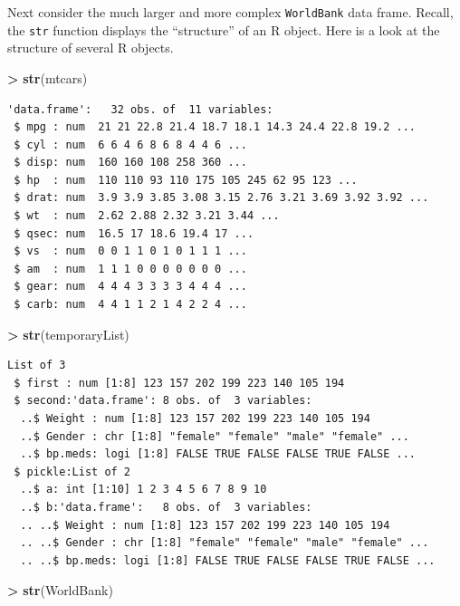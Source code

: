 \documentclass[
]{krantz}
\makeatletter
\newenvironment{Shaded}{\begin{snugshade}}{\end{snugshade}}
\newcommand{\KeywordTok}[1]{\textcolor[rgb]{0.27,0.27,0.27}{\textbf{#1}}}
\newcommand{\NormalTok}[1]{#1}
\newcommand{\OperatorTok}[1]{\textcolor[rgb]{0.43,0.43,0.43}{\textbf{#1}}}
\newcommand{\StringTok}[1]{\textcolor[rgb]{0.5,0.5,0.5}{#1}}
\newenvironment{kframe}{%
\medskip{}
\setlength{\fboxsep}{.8em}
 \def\at@end@of@kframe{}%
 \ifinner\ifhmode%
  \def\at@end@of@kframe{\end{minipage}}%
  \begin{minipage}{\columnwidth}%
 \fi\fi%
 \def\FrameCommand##1{\hskip\@totalleftmargin \hskip-\fboxsep
 \colorbox{shadecolor}{##1}\hskip-\fboxsep
     \hskip-\linewidth \hskip-\@totalleftmargin \hskip\columnwidth}%
 \MakeFramed {\advance\hsize-\width
   \@totalleftmargin\z@ \linewidth\hsize
   \@setminipage}}%
 {\par\unskip\endMakeFramed%
 \at@end@of@kframe}
\renewenvironment{Shaded}{\begin{kframe}}{\end{kframe}}
\makeatother
\begin{document}
Next consider the much larger and more complex \texttt{WorldBank} data frame. Recall, the \texttt{str} function displays the ``structure'' of an R object. Here is a look at the structure of several R objects.

\begin{Shaded}
\begin{Highlighting}[]
\OperatorTok{\textgreater{}}\StringTok{ }\KeywordTok{str}\NormalTok{(mtcars)}
\end{Highlighting}
\end{Shaded}

\begin{verbatim}
'data.frame':   32 obs. of  11 variables:
 $ mpg : num  21 21 22.8 21.4 18.7 18.1 14.3 24.4 22.8 19.2 ...
 $ cyl : num  6 6 4 6 8 6 8 4 4 6 ...
 $ disp: num  160 160 108 258 360 ...
 $ hp  : num  110 110 93 110 175 105 245 62 95 123 ...
 $ drat: num  3.9 3.9 3.85 3.08 3.15 2.76 3.21 3.69 3.92 3.92 ...
 $ wt  : num  2.62 2.88 2.32 3.21 3.44 ...
 $ qsec: num  16.5 17 18.6 19.4 17 ...
 $ vs  : num  0 0 1 1 0 1 0 1 1 1 ...
 $ am  : num  1 1 1 0 0 0 0 0 0 0 ...
 $ gear: num  4 4 4 3 3 3 3 4 4 4 ...
 $ carb: num  4 4 1 1 2 1 4 2 2 4 ...
\end{verbatim}

\begin{Shaded}
\begin{Highlighting}[]
\OperatorTok{\textgreater{}}\StringTok{ }\KeywordTok{str}\NormalTok{(temporaryList)}
\end{Highlighting}
\end{Shaded}

\begin{verbatim}
List of 3
 $ first : num [1:8] 123 157 202 199 223 140 105 194
 $ second:'data.frame': 8 obs. of  3 variables:
  ..$ Weight : num [1:8] 123 157 202 199 223 140 105 194
  ..$ Gender : chr [1:8] "female" "female" "male" "female" ...
  ..$ bp.meds: logi [1:8] FALSE TRUE FALSE FALSE TRUE FALSE ...
 $ pickle:List of 2
  ..$ a: int [1:10] 1 2 3 4 5 6 7 8 9 10
  ..$ b:'data.frame':   8 obs. of  3 variables:
  .. ..$ Weight : num [1:8] 123 157 202 199 223 140 105 194
  .. ..$ Gender : chr [1:8] "female" "female" "male" "female" ...
  .. ..$ bp.meds: logi [1:8] FALSE TRUE FALSE FALSE TRUE FALSE ...
\end{verbatim}

\begin{Shaded}
\begin{Highlighting}[]
\OperatorTok{\textgreater{}}\StringTok{ }\KeywordTok{str}\NormalTok{(WorldBank)}
\end{Highlighting}
\end{Shaded}
\end{document}

